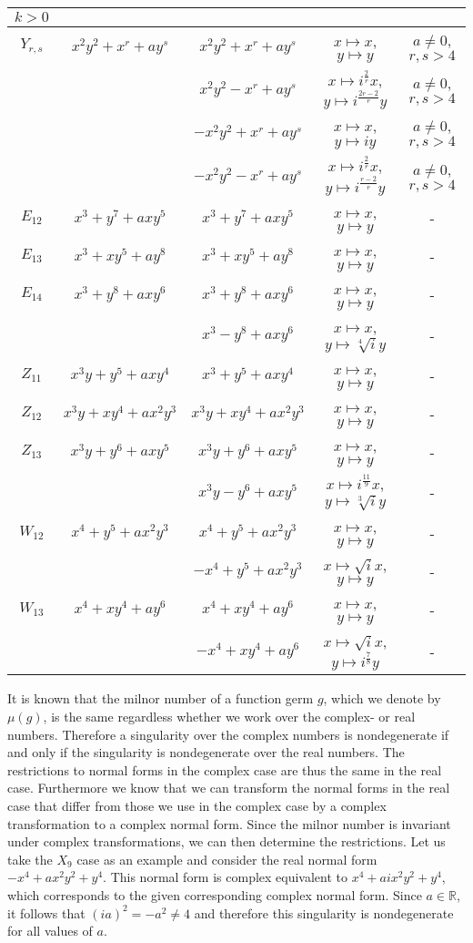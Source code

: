 \documentclass[noend]{amsproc}
\begin{document}
\begin{table}[!hbp]
\begin{tabular}{|c|c|c|c|c|}
$k>0$\\
\hline
$Y_{r,s}$&$x^2y^2+x^r+ay^s$&$x^2y^2+x^r+ay^s$&$x\mapsto x$, $y\mapsto y$
&$a\neq 0$, $r,s>4$\\
&&$x^2y^2-x^r+ay^s$&$x\mapsto i^{\frac{2}{r}}x$, $y\mapsto i^{\frac{2r-2}{r}}y$
&$a\neq 0$, $r,s>4$\\
&&$-x^2y^2+x^r+ay^s$&$x\mapsto x$, $y\mapsto iy$&$a\neq 0$, $r,s>4$\\
&&$-x^2y^2-x^r+ay^s$&$x\mapsto i^{\frac{2}{r}}x$, $y\mapsto i^{\frac{r-2}{r}}y$
&$a\neq 0$, $r,s>4$\\
\hline
$E_{12}$&$x^3+y^7+axy^5$&$x^3+y^7+axy^5$&$x\mapsto x$, $y\mapsto y$&-\\
\hline
$E_{13}$&$x^3+xy^5+ay^8$&$x^3+xy^5+ay^8$&$x\mapsto x$, $y\mapsto y$&-\\
\hline
$E_{14}$&$x^3+y^8+axy^6$&$x^3+y^8+axy^6$&$x\mapsto x$, $y\mapsto y$&-\\
&&$x^3-y^8+axy^6$&$x\mapsto x$, $y\mapsto \sqrt[4]iy$&-\\
\hline
$Z_{11}$&$x^3y+y^5+axy^4$&$x^3+y^5+axy^4$&$x\mapsto x$, $y\mapsto y$&-\\
\hline
$Z_{12}$&$x^3y+xy^4+ax^2y^3$&$x^3y+xy^4+ax^2y^3$&$x\mapsto x$, $y\mapsto y$&-\\
\hline
$Z_{13}$&$x^3y+y^6+axy^5$&$x^3y+y^6+axy^5$&$x\mapsto x$, $y\mapsto y$& -\\
&&$x^3y-y^6+axy^5$&$x\mapsto i^{\frac{11}{9}}x$, $y\mapsto \sqrt[3]i y$& -\\
\hline
$W_{12}$&$x^4+y^5+ax^2y^3$&$x^4+y^5+ax^2y^3$&$x\mapsto x$, $y\mapsto y$&-\\
&&$-x^4+y^5+ax^2y^3$&$x\mapsto\sqrt{i} x$, $y\mapsto y$&-\\
\hline
$W_{13}$&$x^4+xy^4+ay^6$&$x^4+xy^4+ay^6$&$x\mapsto x$, $y\mapsto y$&-\\
&&$-x^4+xy^4+ay^6$&$x\mapsto \sqrt{i}x$, $y\mapsto i^{\frac{7}{8}}y$&-\\
\hline
\end{tabular}
\end{table}

It is known that the milnor number of a function germ $g$, which we denote by
$\mu(g)$, is the same regardless whether we work over the complex- or real
numbers. Therefore a singularity over the complex numbers is nondegenerate if
and only if the singularity is nondegenerate over the real numbers. The
restrictions to normal forms in the complex case are thus the same in the real
case. Furthermore we know that we can transform the normal forms in the real
case that differ from those we use in the complex case by a complex
transformation to a complex normal form. Since the milnor number is invariant
under complex transformations, we can then determine the restrictions. Let us
take the $X_9$ case as an example and consider the real normal form
$-x^4+ax^2y^2+y^4$. This normal form is complex equivalent to
$x^4+aix^2y^2+y^4$, which corresponds to the given corresponding complex normal
form. Since $a\in\mathbb R$, it follows that $(ia)^2=-a^2\neq4$ and therefore
this singularity is nondegenerate for all values of $a$.
\end{document}

